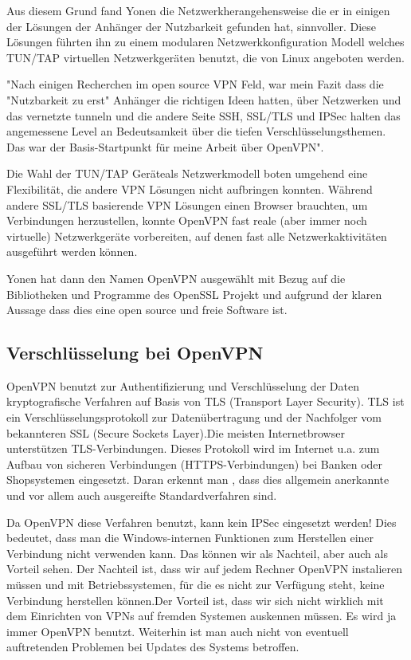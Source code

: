\documentclass[12pt]{scrartcl}
\begin{document}
Aus diesem Grund fand Yonen die Netzwerkherangehensweise die er in einigen der Lösungen der Anhänger der Nutzbarkeit gefunden hat, sinnvoller. Diese Lösungen führten ihn zu einem modularen Netzwerkkonfiguration Modell welches TUN/TAP virtuellen Netzwerkgeräten benutzt, die von Linux angeboten werden.

"Nach einigen Recherchen  im open source VPN Feld, war mein Fazit dass die "Nutzbarkeit zu erst" Anhänger die richtigen Ideen hatten, über Netzwerken und das vernetzte tunneln und die andere Seite SSH, SSL/TLS und IPSec halten das angemessene Level an Bedeutsamkeit über die tiefen Verschlüsselungsthemen. Das war der Basis-Startpunkt für meine Arbeit über OpenVPN".
  
Die Wahl der TUN/TAP Geräteals Netzwerkmodell boten umgehend eine Flexibilität, die andere VPN Lösungen nicht aufbringen konnten. Während andere SSL/TLS basierende VPN Lösungen einen Browser brauchten, um Verbindungen herzustellen, konnte OpenVPN fast reale (aber immer noch virtuelle) Netzwerkgeräte vorbereiten, auf denen fast alle Netzwerkaktivitäten ausgeführt werden können.

Yonen hat dann den Namen OpenVPN ausgewählt mit Bezug auf die Bibliotheken und Programme des OpenSSL Projekt und aufgrund der klaren Aussage dass dies eine open source und freie Software ist.

\subsection{Verschlüsselung bei OpenVPN}

OpenVPN benutzt zur Authentifizierung und Verschlüsselung der Daten kryptografische Verfahren auf Basis von TLS (Transport Layer Security). TLS ist ein Verschlüsselungsprotokoll zur Datenübertragung und der Nachfolger vom bekannteren SSL (Secure Sockets Layer).Die meisten Internetbrowser unterstützen TLS-Verbindungen. Dieses Protokoll wird im Internet u.a. zum Aufbau von sicheren Verbindungen  (HTTPS-Verbindungen) bei Banken oder Shopsystemen  eingesetzt. Daran erkennt man , dass dies allgemein anerkannte und vor allem auch ausgereifte  Standardverfahren sind.

Da OpenVPN diese Verfahren benutzt, kann kein IPSec eingesetzt werden! Dies bedeutet, dass man die Windows-internen Funktionen zum Herstellen einer Verbindung nicht verwenden kann. Das können wir als Nachteil, aber auch als Vorteil sehen. Der Nachteil ist, dass wir auf jedem Rechner OpenVPN instalieren müssen und mit Betriebssystemen, für die es nicht zur Verfügung steht, keine Verbindung herstellen können.Der Vorteil ist, dass wir sich nicht wirklich mit dem Einrichten von VPNs auf fremden Systemen auskennen müssen. Es wird ja immer OpenVPN benutzt. Weiterhin ist man auch nicht von eventuell auftretenden Problemen bei Updates des Systems betroffen.
\end{document}
